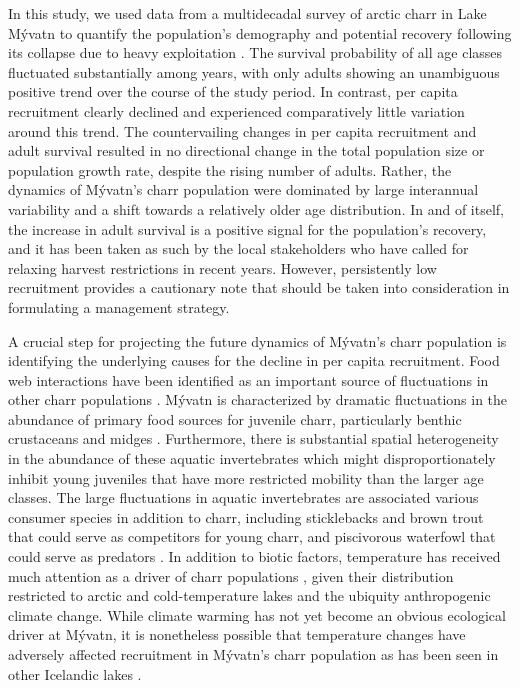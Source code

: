 \documentclass[11pt]{article}
\begin{document}
In this study, 
we used data from a multidecadal survey of arctic charr in Lake M\'{y}vatn
to quantify the population's demography and potential recovery 
following its collapse due to heavy exploitation 
\citep{gudbergsson2004}.
The survival probability of all age classes fluctuated substantially among years,
with only adults showing an unambiguous positive trend over the course of the study period.
In contrast, per capita recruitment clearly declined and experienced comparatively little
variation around this trend.
The countervailing changes in  per capita recruitment and adult survival resulted 
in no directional change in the total population size or population growth rate,
despite the rising number of adults.
Rather, the dynamics of  M\'{y}vatn's charr population 
were dominated by large interannual variability
and a shift towards a relatively older age distribution.
In and of itself, the increase in adult survival 
is a positive signal for the population's recovery,
and it has been taken as such by the local stakeholders 
who have called for relaxing harvest restrictions in recent years.
However, persistently low recruitment provides a cautionary note 
that should be taken into consideration in formulating a management strategy.

A crucial step for projecting the future dynamics of M\'{y}vatn’s charr population 
is identifying the underlying causes for the decline in per capita recruitment.
Food web interactions have been identified as an important source 
of fluctuations in other charr populations 
\citep{snorrason1992population, amundsen1994piscivory, jonsson2015freshwater}.
M\'{y}vatn is characterized by dramatic fluctuations in the abundance 
of primary food sources for juvenile charr, particularly benthic crustaceans 
and midges 
\citep{einarsson2004clad, gardarsson2004population, gudbergsson2004}.
Furthermore, there is substantial spatial heterogeneity in the abundance 
of these aquatic invertebrates \citep{bartrons2015spatial} 
which might disproportionately inhibit young juveniles 
that have more restricted mobility than the larger age classes. 
The large fluctuations in aquatic invertebrates are associated various consumer species 
in addition to charr, including sticklebacks and brown trout that could serve 
as competitors for young charr, and piscivorous waterfowl that could serve as predators 
\citep{einarsson2004myvatn}. 
In addition to biotic factors, 
temperature has received much attention as a driver of charr populations 
\citep{winfield2008arctic, elliott2010temperature, jonsson2015freshwater},
given their distribution restricted to arctic
and cold-temperature lakes \citep{klemetsen2003atlantic}
and the ubiquity anthropogenic climate change. 
While climate warming has not yet become an obvious ecological driver at M\'{y}vatn, 
it is nonetheless possible that temperature changes have adversely affected recruitment 
in M\'{y}vatn’s charr population as has been seen in other Icelandic lakes 
\citep{malmquist2009salmonid}. 
\end{document}
